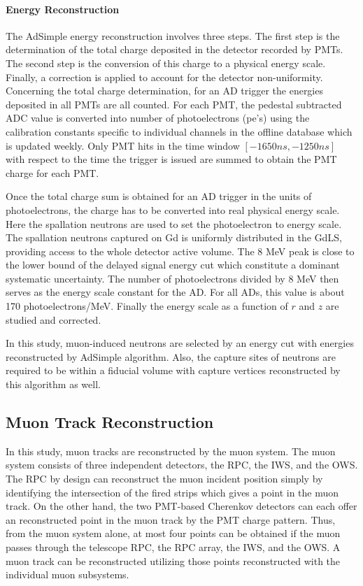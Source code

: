 \paragraph{Energy Reconstruction} The AdSimple energy reconstruction involves three steps. The first step is the determination of the total charge deposited in the detector recorded by PMTs. The second step is the conversion of this charge to a physical energy scale. \mbox{Finally}, a correction is applied to account for the detector non-uniformity.
Concerning the total charge determination, for an AD trigger the energies deposited in all PMTs are all counted. For each PMT, the pedestal subtracted ADC value is converted into number of photoelectrons (pe's) using the calibration constants specific to individual channels in the offline database which is updated weekly. Only PMT hits in the time window $[-1650ns,-1250ns]$ with respect to the time the trigger is issued are summed to obtain the PMT charge for each PMT.

Once the total charge sum is obtained for an AD trigger in the units of photoelectrons, the charge has to be converted into real physical energy scale. Here the spallation neutrons are used to set the photoelectron to energy scale. The spallation neutrons captured on Gd is uniformly distributed in the GdLS, providing access to the whole detector active volume. The 8 MeV peak is close to the lower bound of the delayed signal energy cut which constitute a dominant systematic uncertainty. The number of photoelectrons divided by 8 MeV then serves as the energy scale constant for the AD. For all ADs, this value is about 170 photoelectrons/MeV. Finally the energy scale as a function of $r$ and $z$ are studied and corrected.

In this study, muon-induced neutrons are selected by an energy cut with energies reconstructed by AdSimple algorithm. Also, the capture sites of neutrons are required to be within a fiducial volume with capture vertices reconstructed by this algorithm as well.

\subsection{Muon Track Reconstruction}
In this study, muon tracks are reconstructed by the muon system. The muon system consists of three independent detectors, the RPC, the IWS, and the OWS. The RPC by design can reconstruct the muon incident position simply by identifying the intersection of the fired strips which gives a point in the muon track. On the other hand, the two PMT-based Cherenkov detectors can each offer an reconstructed point in the muon track by the PMT charge pattern. Thus, from the muon system alone, at most four points can be obtained if the muon passes through the telescope RPC, the RPC array, the IWS, and the OWS. A muon track can be reconstructed utilizing those points reconstructed with the individual muon subsystems.

